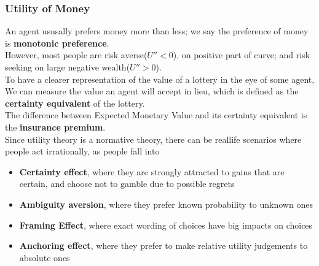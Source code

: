 \documentclass[12pt]{article}
\theoremstyle{definition}
\begin{document}
\subsubsection{Utility of Money}
An agent ususally prefers money more than less; we say the preference of money is \textbf{monotonic preference}.\\
However, most people are risk averse($U''<0$), on positive part of curve; and risk seeking on large negative wealth($U''>0$).\\
To have a clearer representation of the value of a lottery in the eye of some agent, We can measure the value an agent will accept in lieu, which is defined as the \textbf{certainty equivalent} of the lottery.\\
The difference between Expected Monetary Value and its certainty equivalent is the \textbf{insurance premium}.\\
Since utility theory is a normative theory, there can be reallife scenarios where people act irrationally, as people fall into
\begin{itemize}
	\item \textbf{Certainty effect}, where they are strongly attracted to gains that are certain, and choose not to gamble due to possible regrets
	\item \textbf{Ambiguity aversion}, where they prefer known probability to unknown ones
	\item \textbf{Framing Effect}, where exact wording of choices have big impacts on choices
	\item \textbf{Anchoring effect}, where they prefer to make relative utility judgements to absolute ones
\end{itemize}
\end{document}
